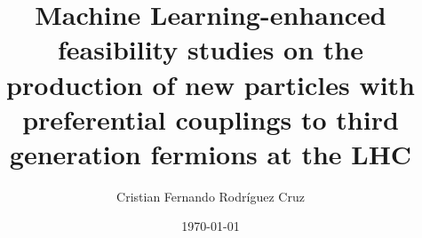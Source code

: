 \documentclass[11pt, letterpaper]{book}%
\title{Machine Learning-enhanced feasibility studies on the production of new particles with preferential couplings to third generation fermions at the LHC}
\author{Cristian Fernando Rodríguez Cruz}
\date{\today}
\begin{document}
	
\frontmatter

\maketitle
\tableofcontents

\mainmatter


\appendix
% 
% 

% 
% 
% 

% 
\backmatter

\renewcommand{\theequation}{{\Alph{chapter}.\arabic{equation}}}
\renewcommand{\thefigure}{{\Alph{chapter}.\arabic{figure}}}
\renewcommand{\thetable}{{\Alph{chapter}.\arabic{table}}}
{}
\printbibliography


\end{document}
